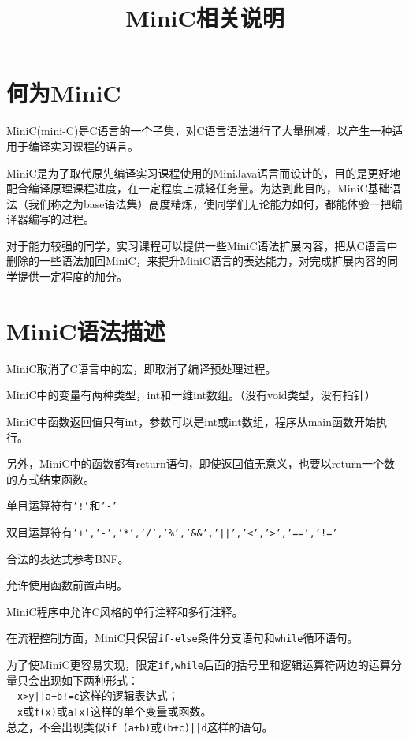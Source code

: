 \documentclass{ctexart}
\title{MiniC相关说明}
\date{}
\author{}
\begin{document}
\maketitle

\section{何为MiniC}
MiniC(mini-C)是C语言的一个子集，对C语言语法进行了大量删减，以产生一种适用于编译实习课程的语言。

MiniC是为了取代原先编译实习课程使用的MiniJava语言而设计的，目的是更好地配合编译原理课程进度，在一定程度上减轻任务量。为达到此目的，MiniC基础语法（我们称之为base语法集）高度精炼，使同学们无论能力如何，都能体验一把编译器编写的过程。

对于能力较强的同学，实习课程可以提供一些MiniC语法扩展内容，把从C语言中删除的一些语法加回MiniC，来提升MiniC语言的表达能力，对完成扩展内容的同学提供一定程度的加分。

\section{MiniC语法描述}
MiniC取消了C语言中的宏，即取消了编译预处理过程。

MiniC中的变量有两种类型，int和一维int数组。（没有void类型，没有指针）

MiniC中函数返回值只有int，参数可以是int或int数组，程序从main函数开始执行。

另外，MiniC中的函数都有return语句，即使返回值无意义，也要以return一个数的方式结束函数。

单目运算符有\texttt{'!'}和\texttt{'-'}

双目运算符有\texttt{'+','-','*','/','\%','\&\&','||','\textless','\textgreater','==','!='}

合法的表达式参考BNF。

允许使用函数前置声明。

MiniC程序中允许C风格的单行注释和多行注释。

在流程控制方面，MiniC只保留\texttt{if-else}条件分支语句和\texttt{while}循环语句。

为了使MiniC更容易实现，限定\texttt{if,while}后面的括号里和逻辑运算符两边的运算分量只会出现如下两种形式：\\
\indent\ \ \texttt{x>y||a+b!=c}这样的逻辑表达式；\\
\indent\ \ \texttt{x}或\texttt{f(x)}或\texttt{a[x]}这样的单个变量或函数。\\
\indent 总之，不会出现类似\texttt{if (a+b)}或\texttt{(b+c)||d}这样的语句。
\end{document}
